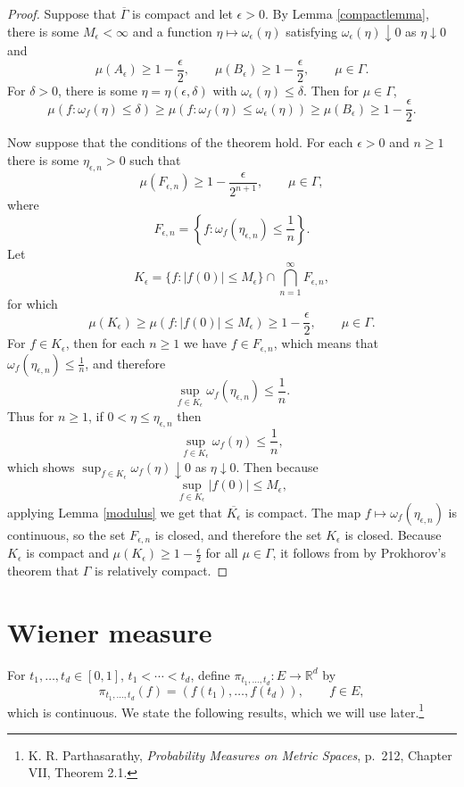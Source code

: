 \documentclass{article}
\theoremstyle{definition}
\theoremstyle{definition}
\begin{document}
\begin{proof}
Suppose that $\overline{\Gamma}$ is compact and let $\epsilon>0$.
By Lemma \ref{compactlemma}, there is some $M_\epsilon<\infty$ and a function $\eta \mapsto \omega_\epsilon(\eta)$
satisfying $\omega_\epsilon(\eta) \downarrow 0$ as $\eta \downarrow 0$ and
\[
\mu(A_\epsilon) \geq 1-\frac{\epsilon}{2},\qquad \mu(B_\epsilon) \geq 1-\frac{\epsilon}{2},
\qquad \mu \in \Gamma.
\]
For $\delta>0$, there is some $\eta = \eta(\epsilon,\delta)$ with $\omega_\epsilon(\eta) \leq \delta$. Then for
$\mu \in \Gamma$,
\[
\mu(f : \omega_f(\eta) \leq \delta) \geq 
\mu(f : \omega_f(\eta) \leq \omega_\epsilon(\eta))
\geq \mu(B_\epsilon)
\geq 1-\frac{\epsilon}{2}.
\]

Now suppose that the conditions of the theorem hold. For  each $\epsilon>0$ and $n \geq 1$ there is some
$\eta_{\epsilon,n}>0$ such that 
\[
\mu(F_{\epsilon,n}) \geq 1-\frac{\epsilon}{2^{n+1}},\qquad \mu \in \Gamma,
\]
where
\[
F_{\epsilon,n} = \left\{f : \omega_f(\eta_{\epsilon,n}) \leq \frac{1}{n}\right\}.
\]
Let
\[
K_\epsilon = \{f : |f(0)| \leq M_\epsilon\} \cap \bigcap_{n=1}^\infty F_{\epsilon,n},
\]
for which
\[
\mu(K_\epsilon) \geq \mu(f : |f(0)| \leq M_\epsilon) \geq 1-\frac{\epsilon}{2},\qquad \mu \in \Gamma.
\]
For $f \in K_\epsilon$, then for each $n \geq 1$ we have $f \in F_{\epsilon,n}$, which means that
$\omega_f(\eta_{\epsilon,n}) \leq \frac{1}{n}$, and therefore
\[
\sup_{f \in K_\epsilon} \omega_f(\eta_{\epsilon,n}) \leq \frac{1}{n}.
\]
Thus for $n \geq 1$, if $0<\eta \leq \eta_{\epsilon,n}$ then
\[
\sup_{f \in K_\epsilon} \omega_f(\eta) \leq \frac{1}{n},
\]
which shows $\sup_{f \in K_\epsilon} \omega_f(\eta) \downarrow 0$ as $\eta \downarrow 0$. 
Then because
\[
\sup_{f \in K_\epsilon} |f(0)| \leq M_\epsilon,
\]
applying Lemma \ref{modulus} we get that $\overline{K_\epsilon}$ is compact. The map
$f \mapsto \omega_f(\eta_{\epsilon,n})$ is continuous, so the set $F_{\epsilon,n}$ is closed, and therefore
the set $K_\epsilon$ is closed.  
Because $K_\epsilon$ is compact and $\mu(K_\epsilon) \geq 1-\frac{\epsilon}{2}$ for all
$\mu \in \Gamma$, it follows from
by Prokhorov's theorem that  $\Gamma$ is relatively compact. 
\end{proof}



\section{Wiener measure}
For $t_1,\ldots,t_d \in [0,1]$, $t_1<\cdots<t_d$, 
define $\pi_{t_1,\ldots,t_d}:E \to \mathbb{R}^d$ by 
\[
\pi_{t_1,\ldots,t_d}(f) = (f(t_1),\ldots,f(t_d)),\qquad f \in E,
\]
which is continuous. We state the following results, which we will use later.\footnote{K. R.
Parthasarathy, {\em Probability Measures on Metric Spaces}, p.~212, Chapter VII, Theorem 2.1.}
\end{document}
